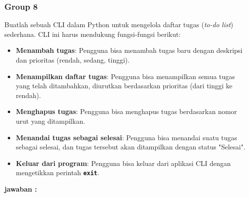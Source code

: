 \documentclass[12pt]{article}
\begin{document}
	\subsubsection{Group 8}
	Buatlah sebuah CLI dalam Python untuk mengelola daftar tugas (\textit{to-do list}) sederhana. CLI ini harus mendukung fungsi-fungsi berikut:
	\begin{itemize}
		\item \textbf{Menambah tugas}: Pengguna bisa menambah tugas baru dengan deskripsi dan prioritas (rendah, sedang, tinggi).
		\item \textbf{Menampilkan daftar tugas}: Pengguna bisa menampilkan semua tugas yang telah ditambahkan, diurutkan berdasarkan prioritas (dari tinggi ke rendah).
		\item \textbf{Menghapus tugas}: Pengguna bisa menghapus tugas berdasarkan nomor urut yang ditampilkan.
		\item \textbf{Menandai tugas sebagai selesai}: Pengguna bisa menandai suatu tugas sebagai selesai, dan tugas tersebut akan ditampilkan dengan status "Selesai".
		\item \textbf{Keluar dari program}: Pengguna bisa keluar dari aplikasi CLI dengan mengetikkan perintah \texttt{\textbf{exit}}.
	\end{itemize}
	\textbf{jawaban :}
	
	
\end{document}
